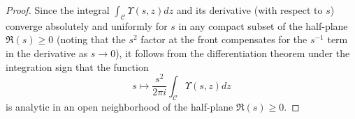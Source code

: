 \documentclass[10pt,a4paper]{amsart}
\newcommand{\difrac}{\displaystyle \frac}
\newcommand{\diint}{\displaystyle \int}
\begin{document}
\begin{proof}
Since the integral $\diint_{\mathcal{C}} \Upsilon(s, z) dz$ and its derivative (with respect to $s$) converge absolutely and uniformly for $s$ in any compact subset of the half-plane $\Re(s) \geq 0$ (noting that the $s^2$ factor at the front compensates for the $s^{-1}$ term in the derivative as $s \to 0$), it follows from the differentiation theorem under the integration sign that the function$$s \mapsto \difrac{s^2}{2\pi i} \int_{\mathcal{C}} \Upsilon(s, z) dz $$is analytic in an open neighborhood of the half-plane $\Re(s) \geq 0$. \end{proof}
\end{document}
